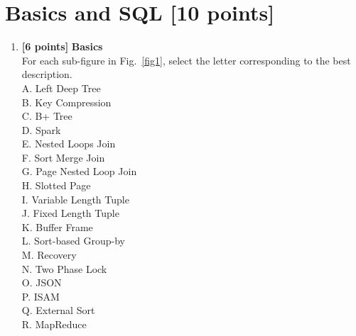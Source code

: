 \documentclass[10pt]{article}
\begin{document}


\section{Basics and SQL \textbf{[10 points]}}
\begin{enumerate}
	\item \textbf{[6 points]} \textbf{Basics} \\
	      For each sub-figure in Fig.~\ref{fig1}, select the letter corresponding to the best description. \\
	      A. Left Deep Tree \\
	      B. Key Compression \\
	      C. B+ Tree \\
	      D. Spark \\
	      E. Nested Loops Join \\
	      F. Sort Merge Join \\
	      G. Page Nested Loop Join \\
	      H. Slotted Page \\
	      I. Variable Length Tuple \\
	      J. Fixed Length Tuple \\
	      K. Buffer Frame \\
	      L. Sort-based Group-by \\
	      M. Recovery \\
	      N. Two Phase Lock \\
	      O. JSON \\
	      P. ISAM \\
	      Q. External Sort \\
	      R. MapReduce
	      \begin{figure}
		      \centering

\end{figure}
\end{enumerate}
\end{document}
